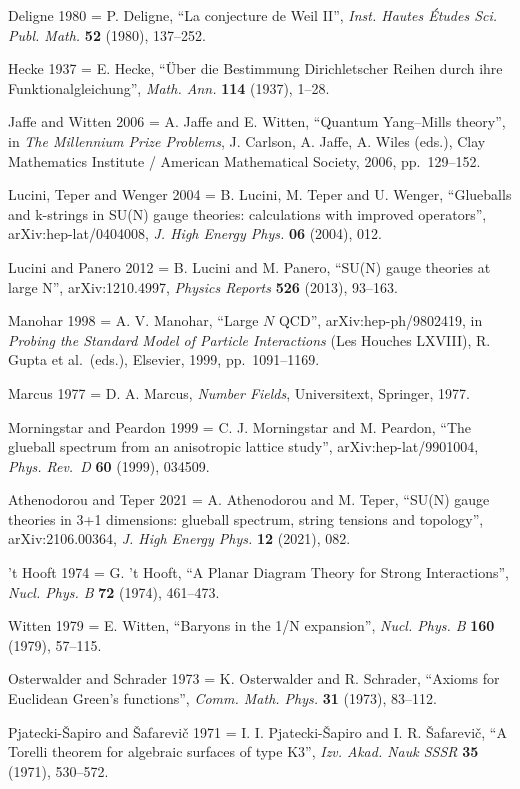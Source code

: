 \documentclass[
  11pt,
  a4paper,
]{amsart}
\begin{document}
Deligne 1980 = P. Deligne, ``La conjecture de Weil II'', \emph{Inst. Hautes Études Sci. Publ. Math.} \textbf{52} (1980), 137--252.

Hecke 1937 = E. Hecke, ``Über die Bestimmung Dirichletscher Reihen durch ihre Funktionalgleichung'', \emph{Math. Ann.} \textbf{114} (1937), 1--28.

Jaffe and Witten 2006 = A. Jaffe and E. Witten, ``Quantum Yang--Mills theory'', in \emph{The Millennium Prize Problems}, J. Carlson, A. Jaffe, A. Wiles (eds.), Clay Mathematics Institute / American Mathematical Society, 2006, pp.~129--152.

Lucini, Teper and Wenger 2004 = B. Lucini, M. Teper and U. Wenger, ``Glueballs and k-strings in SU(N) gauge theories: calculations with improved operators'', arXiv:hep-lat/0404008, \emph{J. High Energy Phys.} \textbf{06} (2004), 012.

Lucini and Panero 2012 = B. Lucini and M. Panero, ``SU(N) gauge theories at large N'', arXiv:1210.4997, \emph{Physics Reports} \textbf{526} (2013), 93--163.

Manohar 1998 = A. V. Manohar, ``Large \(N\) QCD'', arXiv:hep-ph/9802419, in \emph{Probing the Standard Model of Particle Interactions} (Les Houches LXVIII), R. Gupta et al.~(eds.), Elsevier, 1999, pp.~1091--1169.

Marcus 1977 = D. A. Marcus, \emph{Number Fields}, Universitext, Springer, 1977.

Morningstar and Peardon 1999 = C. J. Morningstar and M. Peardon, ``The glueball spectrum from an anisotropic lattice study'', arXiv:hep-lat/9901004, \emph{Phys. Rev.~D} \textbf{60} (1999), 034509.

Athenodorou and Teper 2021 = A. Athenodorou and M. Teper, ``SU(N) gauge theories in 3+1 dimensions: glueball spectrum, string tensions and topology'', arXiv:2106.00364, \emph{J. High Energy Phys.} \textbf{12} (2021), 082.

't Hooft 1974 = G. 't Hooft, ``A Planar Diagram Theory for Strong Interactions'', \emph{Nucl. Phys. B} \textbf{72} (1974), 461--473.

Witten 1979 = E. Witten, ``Baryons in the 1/N expansion'', \emph{Nucl. Phys. B} \textbf{160} (1979), 57--115.

Osterwalder and Schrader 1973 = K. Osterwalder and R. Schrader, ``Axioms for Euclidean Green's functions'', \emph{Comm. Math. Phys.} \textbf{31} (1973), 83--112.

Pjatecki-Šapiro and Šafarevič 1971 = I. I. Pjatecki-Šapiro and I. R. Šafarevič, ``A Torelli theorem for algebraic surfaces of type K3'', \emph{Izv. Akad. Nauk SSSR} \textbf{35} (1971), 530--572.
\end{document}
